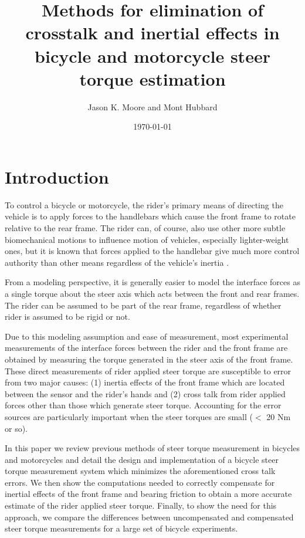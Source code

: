 \documentclass[a4paper]{article}
\title{Methods for elimination of crosstalk and inertial effects in bicycle and motorcycle steer torque estimation}
\author{Jason K. Moore and Mont Hubbard}
\date{\today}
\begin{document}
\maketitle

\section*{Introduction}

To control a bicycle or motorcycle, the rider's primary means of directing the
vehicle is to apply forces to the handlebars which cause the front frame to
rotate relative to the rear frame. The rider can, of course, also use other
more subtle biomechanical motions to influence motion of vehicles,
especially lighter-weight ones, but it is known that forces
applied to the handlebar give much more control authority than other means
regardless of the vehicle's inertia \cite{Sharp2007,Sharp2008a}.

From a modeling perspective, it is generally easier to model the interface
forces as a single torque about the steer
axis which acts between the front and rear frames. The rider can be
assumed to be part of the rear frame, regardless of whether rider is assumed to be 
rigid or not.

Due to this modeling assumption and ease of measurement, most experimental
measurements of the interface forces between the rider and the front frame are
obtained by measuring the torque generated in the steer axis of the front
frame. These direct measurements of rider applied steer torque are
susceptible to error from two major causes: (1) inertia effects of the front
frame which are located between the sensor and the rider's hands and (2) cross
talk from rider applied forces other than those which generate steer torque.
Accounting for the error sources are particularly important when the steer
torques are small ($<$ 20 Nm or so).

In this paper we review previous methods of steer torque measurement in
bicycles and motorcycles and detail the design and
implementation of a bicycle steer torque measurement system which minimizes the
aforementioned cross talk errors. We then show the computations needed to
correctly compensate for inertial effects of the front frame and bearing
friction to obtain a more accurate estimate of the rider applied steer torque.
Finally, to show the need for this approach, we compare the differences
between uncompensated and compensated steer torque measurements for a large
set of bicycle experiments.
\end{document}
